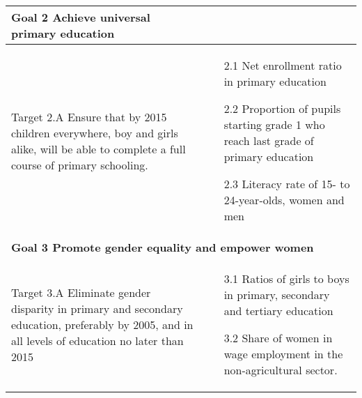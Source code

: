 \documentclass{article}
\begin{document}
\begin{center}
\begin{tabularx}{\textwidth}[t]{XX}
\arrayrulecolor{green}\hline
\textbf{\textcolor{myGreen}{Goal 2 Achieve universal primary education}} \\
\hline

Target 2.A Ensure that by 2015 children everywhere, boy and girls alike, will be able to complete a full course of primary schooling. &
\begin{minipage}[t]{\linewidth}%
\begin{itemize}
\item[2.1] Net enrollment ratio in primary education
\item[2.2] Proportion of pupils starting grade 1 who reach last grade of primary education
\item[2.3] Literacy rate of 15- to 24-year-olds, women and men
\end{itemize}
\end{minipage}\\

\hline
\multicolumn{2}{l}{%
\textbf{\textcolor{myGreen}{Goal 3 Promote gender equality and empower women}}} \\
\hline

Target 3.A Eliminate gender disparity in primary and secondary education, preferably by 2005, and in all levels of education no later than 2015 &
\begin{minipage}[t]{\linewidth}%
\begin{itemize}
\item[3.1] Ratios of girls to boys in primary, secondary and tertiary education
\item[3.2] Share of women in wage employment in the non-agricultural sector.
\end{itemize} 
\end{minipage}
\end{tabularx}
\end{center}
\end{document}
